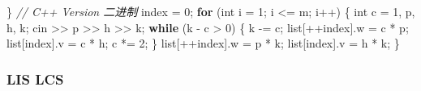 \documentclass[
]{article}
\newenvironment{Shaded}{}{}
\newcommand{\CommentTok}[1]{\textcolor[rgb]{0.38,0.63,0.69}{\textit{#1}}}
\newcommand{\ControlFlowTok}[1]{\textcolor[rgb]{0.00,0.44,0.13}{\textbf{#1}}}
\newcommand{\DataTypeTok}[1]{\textcolor[rgb]{0.56,0.13,0.00}{#1}}
\newcommand{\DecValTok}[1]{\textcolor[rgb]{0.25,0.63,0.44}{#1}}
\newcommand{\NormalTok}[1]{#1}
\newcommand{\OperatorTok}[1]{\textcolor[rgb]{0.40,0.40,0.40}{#1}}
\begin{document}
\begin{Shaded}
\begin{Highlighting}[]
\OperatorTok{\}}
\CommentTok{// C++ Version 二进制}
\NormalTok{index }\OperatorTok{=} \DecValTok{0}\OperatorTok{;}
\ControlFlowTok{for} \OperatorTok{(}\DataTypeTok{int}\NormalTok{ i }\OperatorTok{=} \DecValTok{1}\OperatorTok{;}\NormalTok{ i }\OperatorTok{\textless{}=}\NormalTok{ m}\OperatorTok{;}\NormalTok{ i}\OperatorTok{++)} \OperatorTok{\{}
  \DataTypeTok{int}\NormalTok{ c }\OperatorTok{=} \DecValTok{1}\OperatorTok{,}\NormalTok{ p}\OperatorTok{,}\NormalTok{ h}\OperatorTok{,}\NormalTok{ k}\OperatorTok{;}
\NormalTok{  cin }\OperatorTok{\textgreater{}\textgreater{}}\NormalTok{ p }\OperatorTok{\textgreater{}\textgreater{}}\NormalTok{ h }\OperatorTok{\textgreater{}\textgreater{}}\NormalTok{ k}\OperatorTok{;}
  \ControlFlowTok{while} \OperatorTok{(}\NormalTok{k }\OperatorTok{{-}}\NormalTok{ c }\OperatorTok{\textgreater{}} \DecValTok{0}\OperatorTok{)} \OperatorTok{\{}
\NormalTok{    k }\OperatorTok{{-}=}\NormalTok{ c}\OperatorTok{;}
\NormalTok{    list}\OperatorTok{[++}\NormalTok{index}\OperatorTok{].}\NormalTok{w }\OperatorTok{=}\NormalTok{ c }\OperatorTok{*}\NormalTok{ p}\OperatorTok{;}
\NormalTok{    list}\OperatorTok{[}\NormalTok{index}\OperatorTok{].}\NormalTok{v }\OperatorTok{=}\NormalTok{ c }\OperatorTok{*}\NormalTok{ h}\OperatorTok{;}
\NormalTok{    c }\OperatorTok{*=} \DecValTok{2}\OperatorTok{;}
  \OperatorTok{\}}
\NormalTok{  list}\OperatorTok{[++}\NormalTok{index}\OperatorTok{].}\NormalTok{w }\OperatorTok{=}\NormalTok{ p }\OperatorTok{*}\NormalTok{ k}\OperatorTok{;}
\NormalTok{  list}\OperatorTok{[}\NormalTok{index}\OperatorTok{].}\NormalTok{v }\OperatorTok{=}\NormalTok{ h }\OperatorTok{*}\NormalTok{ k}\OperatorTok{;}
\OperatorTok{\}}                  
\end{Highlighting}
\end{Shaded}

\hypertarget{lis-lcs}{%
\subsubsection{LIS LCS}\label{lis-lcs}}
\end{document}
